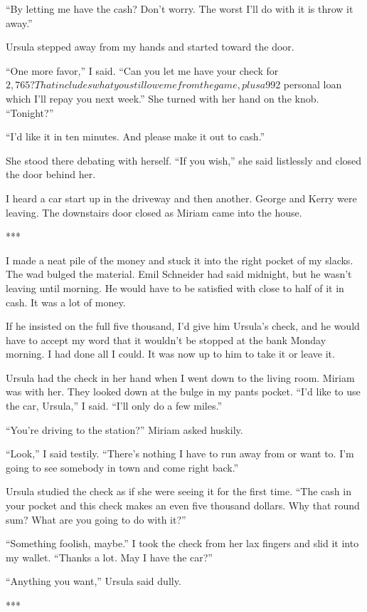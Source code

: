 \documentclass{novel}
\begin{document}
{“By letting me have the cash? Don’t worry. The worst I’ll do with it is throw it away.”

Ursula stepped away from my hands and started toward the door.

“One more favor,” I said. “Can you let me have your check for $2,765? That includes what you still owe me from the game, plus a $992 personal loan which I’ll repay you next week.” She turned with her hand on the knob. “Tonight?”

“I’d like it in ten minutes. And please make it out to cash.”

She stood there debating with herself. “If you wish,” she said listlessly and closed the door behind her.

I heard a car start up in the driveway and then another. George and Kerry were leaving. The downstairs door closed as Miriam came into the house.

***

I made a neat pile of the money and stuck it into the right pocket of my slacks. The wad bulged the material. Emil Schneider had said midnight, but he wasn’t leaving until morning. He would have to be satisfied with close to half of it in cash. It was a lot of money.

If he insisted on the full five thousand, I’d give him Ursula’s check, and he would have to accept my word that it wouldn’t be stopped at the bank Monday morning. I had done all I could. It was now up to him to take it or leave it.

Ursula had the check in her hand when I went down to the living room. Miriam was with her. They looked down at the bulge in my pants pocket. “I’d like to use the car, Ursula,” I said. “I’ll only do a few miles.”

“You’re driving to the station?” Miriam asked huskily.

“Look,” I said testily. “There’s nothing I have to run away from or want to. I’m going to see somebody in town and come right back.”

Ursula studied the check as if she were seeing it for the first time. “The cash in your pocket and this check makes an even five thousand dollars. Why that round sum? What are you going to do with it?”

“Something foolish, maybe.” I took the check from her lax fingers and slid it into my wallet. “Thanks a lot. May I have the car?”

“Anything you want,” Ursula said dully.

***

}
\end{document}
